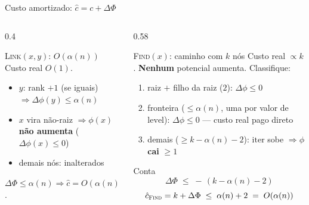 \documentclass[aspectratio=169]{beamer}
\begin{document}
\begin{frame}[shrink=12]{Custo amortizado: $\hat c = c + \Delta\Phi$}%
  \begin{columns}[T]
    \begin{column}{0.4\textwidth}
      \begin{block}{\textsc{Link}$(x,y)$: $O(\alpha(n))$}
        Custo real $O(1)$.
        \begin{itemize}
          \item $y$: rank $+1$ (se iguais) $\Rightarrow \Delta\phi(y)\leq \alpha(n)$
          \item $x$ vira não-raiz $\Rightarrow \phi(x)$ \textbf{não aumenta} ($\Delta\phi(x)\leq 0$)
          \item demais nós: inalterados
        \end{itemize}
        $\Delta\Phi \leq \alpha(n) \Rightarrow \hat c = O(\alpha(n))$.
      \end{block}
    \end{column}
    \begin{column}{0.58\textwidth}
      \begin{block}{\textsc{Find}$(x)$: caminho com $k$ nós}
        Custo real $\propto k$. \textbf{Nenhum} potencial aumenta. Classifique:
        \begin{enumerate}
          \item raiz $+$ filho da raiz ($2$): $\Delta\phi\leq 0$
          \item fronteira ($\leq \alpha(n)$, uma por valor de $\mathrm{level}$): $\Delta\phi\leq 0$
            --- custo real pago direto
          \item demais ($\geq k-\alpha(n)-2$): $\mathrm{iter}$ sobe $\Rightarrow \phi$ \textbf{cai} $\geq 1$
        \end{enumerate}
      \end{block}
      \begin{exampleblock}{Conta}
        \vspace{-0.2cm}
        \[ \Delta\Phi \;\leq\; -\,(k-\alpha(n)-2) \]
        \vspace{-0.45cm}
        \[ \hat c_{\textsc{Find}} = k + \Delta\Phi \;\leq\; \alpha(n)+2 \;=\; O(\alpha(n)) \]
      \end{exampleblock}
    \end{column}
  \end{columns}
\end{frame}
\end{document}

